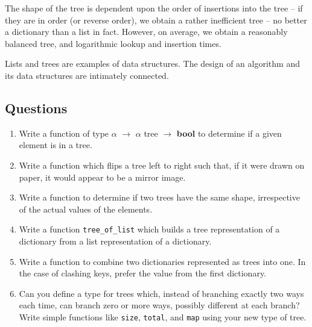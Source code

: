 \documentclass[]{book}
\begin{document}
\noindent The shape of the tree is dependent upon the order of insertions into the tree -- if they are in order (or reverse order), we obtain a rather inefficient tree -- no better a dictionary than a list in fact. However, on average, we obtain a reasonably balanced tree, and logarithmic lookup and insertion times.

Lists and trees are examples of data structures. The design of an algorithm and its data structures are intimately connected. 

\clearpage
\section*{Questions}

\begin{enumerate}
  \item Write a function of type \textrm{$\alpha$ $\rightarrow$ $\alpha$ tree $\rightarrow$ \textbf{bool}} to determine if a given element is in a tree.
  \item Write a function which flips a tree left to right such that, if it were drawn on paper, it would appear to be a mirror image. 
  \item Write a function to determine if two trees have the same shape,
    irrespective of the actual values of the elements.
  \item Write a function \texttt{tree\_of\_list} which builds a tree representation of a dictionary from a list representation of a dictionary.
  \item Write a function to combine two dictionaries represented as trees into one. In the case of clashing keys, prefer the value from the first dictionary.  \item Can you define a type for trees which, instead of branching exactly two ways each time, can branch zero or more ways, possibly different at each branch? Write simple functions like \texttt{size}, \texttt{total}, and \texttt{map} using your new type of tree.
\end{enumerate}

\cleardoublepage
\thispagestyle{empty}
\chapter*{}
\\
\end{document}
